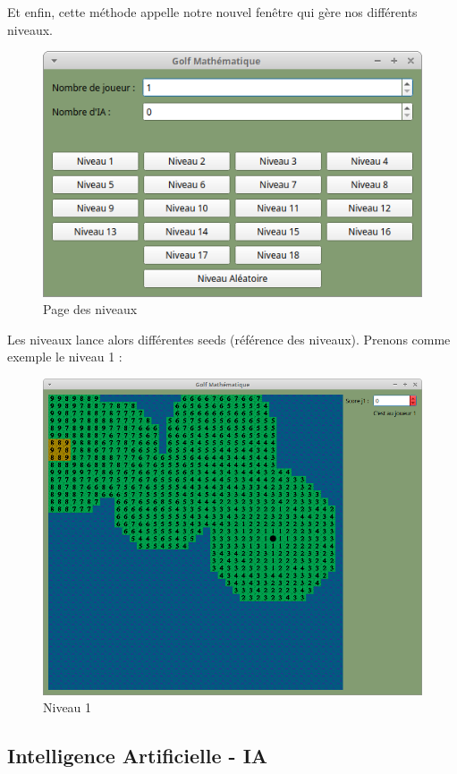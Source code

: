 \documentclass{article}
\begin{document}
Et enfin, cette méthode appelle notre nouvel fenêtre qui gère nos différents niveaux.\\
\begin{figure}
\centering
\includegraphics[scale=0.5]{Images/niveaux.png}
\caption{Page des niveaux}
\end{figure}
Les niveaux lance alors différentes seeds (référence des niveaux). Prenons comme exemple le niveau 1 :
\begin{figure}
\centering
\includegraphics[scale=0.3]{Images/niveau1.png}
\caption{Niveau 1}
\end{figure}
\newpage
\subsection{Intelligence Artificielle - IA}
\newpage
\end{document}
